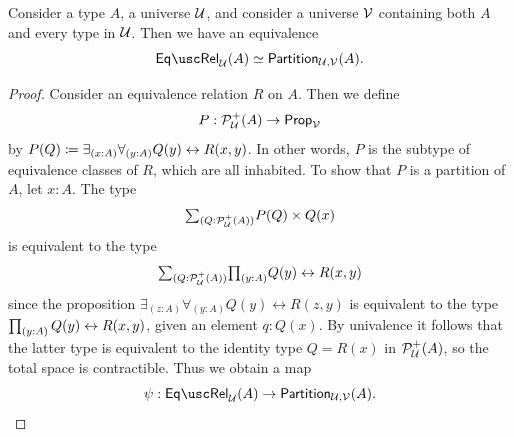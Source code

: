 \begin{thm}
  Consider a type $A$, a universe $\mathcal{U}$, and consider a universe $\mathcal{V}$ containing both $A$ and every type in $\mathcal{U}$. Then we have an equivalence
  \begin{equation*}
    \eqrel_{\UU}(A)\simeq\partition_{\UU,\VV}(A).
  \end{equation*}
\end{thm}

\begin{proof}
  Consider an equivalence relation $R$ on $A$. Then we define
  \begin{equation*}
    P:\mathcal{P}_{\mathcal{U}}^+(A)\to\mathsf{Prop}_{\mathcal{V}}
  \end{equation*}
  by $P(Q)\coloneqq\exists_{(x:A)}\forall_{(y:A)}Q(y)\leftrightarrow R(x,y)$. In other words, $P$ is the subtype of equivalence classes of $R$, which are all inhabited. To show that $P$ is a partition of $A$, let $x:A$. The type
  \begin{equation*}
    \sm{Q:\mathcal{P}_{\UU}^+(A)}P(Q)\times Q(x)
  \end{equation*}
  is equivalent to the type
  \begin{equation*}
    \sm{Q:\mathcal{P}_{\UU}^+(A)}\prd{y:A}Q(y)\leftrightarrow R(x,y)
  \end{equation*}
  since the proposition $\exists_{(z:A)}\forall_{(y:A)}Q(y)\leftrightarrow R(z,y)$ is equivalent to the type $\prd{y:A}Q(y)\leftrightarrow R(x,y)$, given an element $q:Q(x)$. By univalence it follows that the latter type is equivalent to the identity type $Q=R(x)$ in $\mathcal{P}_{\mathcal{U}}^+(A)$, so the total space is contractible. Thus we obtain a map
  \begin{equation*}
    \psi:\eqrel_{\mathcal{U}}(A)\to\partition_{\UU,\VV}(A).
  \end{equation*}
  

\end{proof}
